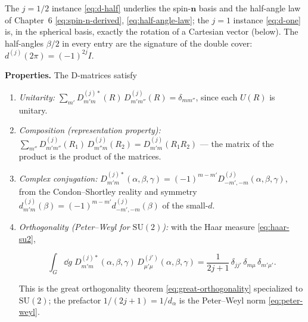 The $j=1/2$ instance \eqref{eq:d-half} underlies the spin-$\bm n$ basis and the half-angle law of Chapter~6 \eqref{eq:spin-n-derived}, \eqref{eq:half-angle-law}; the $j=1$ instance \eqref{eq:d-one} is, in the spherical basis, exactly the rotation of a Cartesian vector (below). The half-angles $\beta/2$ in every entry are the signature of the double cover: $d^{(j)}(2\pi)=(-1)^{2j}I$.

\medskip\noindent\textbf{Properties.} The D-matrices satisfy
\begin{enumerate}
\item \emph{Unitarity:} $\sum_{m'}D^{(j)*}_{m'm}(R)\,D^{(j)}_{m'm''}(R)=\delta_{mm''}$, since each $U(R)$ is unitary.
\item \emph{Composition (representation property):} $\sum_{m''}D^{(j)}_{m'm''}(R_{1})\,D^{(j)}_{m''m}(R_{2})=D^{(j)}_{m'm}(R_{1}R_{2})$ --- the matrix of the product is the product of the matrices.
\item \emph{Complex conjugation:} $D^{(j)*}_{m'm}(\alpha,\beta,\gamma)=(-1)^{m-m'}D^{(j)}_{-m',-m}(\alpha,\beta,\gamma)$, from the Condon--Shortley reality and symmetry $d^{(j)}_{m'm}(\beta)=(-1)^{m-m'}d^{(j)}_{-m',-m}(\beta)$ of the small-$d$.
\item \emph{Orthogonality (Peter--Weyl for $\mathrm{SU}(2)$):} with the Haar measure \eqref{eq:haar-su2},
\begin{linenomath}
\begin{equation}
\int_{G}\dd g\;D^{(j)*}_{m'm}(\alpha,\beta,\gamma)\,D^{(j')}_{\mu'\mu}(\alpha,\beta,\gamma)
=\frac{1}{2j+1}\,\delta_{jj'}\,\delta_{m\mu}\,\delta_{m'\mu'}.
\label{eq:D-orthogonality}
\end{equation}
\end{linenomath}
This is the great orthogonality theorem \eqref{eq:great-orthogonality} specialized to $\mathrm{SU}(2)$; the prefactor $1/(2j+1)=1/d_{\alpha}$ is the Peter--Weyl norm \eqref{eq:peter-weyl}.
\end{enumerate}

